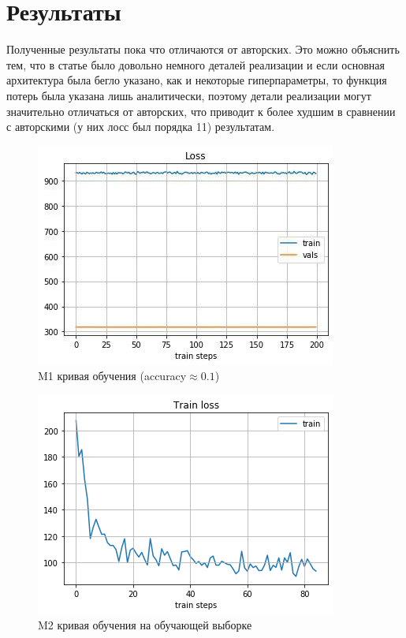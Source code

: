 \documentclass{article}
\begin{document}
\section{Результаты}
Полученные результаты пока что отличаются от авторских. Это можно объяснить тем, что в статье было довольно немного деталей реализации и если основная архитектура была бегло указано, как и некоторые гиперпараметры, то функция потерь была указана лишь аналитически, поэтому детали реализации могут значительно отличаться от авторских, что приводит к более худшим в сравнении с авторскими (у них лосс был порядка 11) результатам.
\begin{figure}[htbp]
    \centering
    \includegraphics[scale=0.6]{data}
    \caption{M1 кривая обучения (accuracy$\approx 0.1$)}
\end{figure}
\begin{figure}[htbp]
    \centering
    \includegraphics[scale=0.6]{train}
    \caption{M2 кривая обучения на обучающей выборке}
\end{figure}
\end{document}
